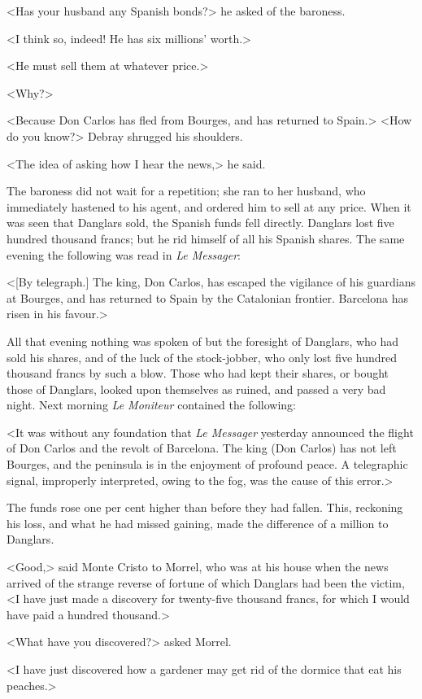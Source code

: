  <Has your husband any Spanish bonds?> he asked of the baroness. 

 <I think so, indeed! He has six millions' worth.> 

 <He must sell them at whatever price.> 

 <Why?> 

 <Because Don Carlos has fled from Bourges, and has returned to Spain.>  <How do you know?> Debray shrugged his shoulders. 

 <The idea of asking how I hear the news,> he said. 

 The baroness did not wait for a repetition; she ran to her husband, who immediately hastened to his agent, and ordered him to sell at any price. When it was seen that Danglars sold, the Spanish funds fell directly. Danglars lost five hundred thousand francs; but he rid himself of all his Spanish shares. The same evening the following was read in \textit{Le Messager}: 

 <[By telegraph.] The king, Don Carlos, has escaped the vigilance of his guardians at Bourges, and has returned to Spain by the Catalonian frontier. Barcelona has risen in his favour.> 

 All that evening nothing was spoken of but the foresight of Danglars, who had sold his shares, and of the luck of the stock-jobber, who only lost five hundred thousand francs by such a blow. Those who had kept their shares, or bought those of Danglars, looked upon themselves as ruined, and passed a very bad night. Next morning \textit{Le Moniteur} contained the following: 

 <It was without any foundation that \textit{Le Messager} yesterday announced the flight of Don Carlos and the revolt of Barcelona. The king (Don Carlos) has not left Bourges, and the peninsula is in the enjoyment of profound peace. A telegraphic signal, improperly interpreted, owing to the fog, was the cause of this error.> 

 The funds rose one per cent higher than before they had fallen. This, reckoning his loss, and what he had missed gaining, made the difference of a million to Danglars. 

 <Good,> said Monte Cristo to Morrel, who was at his house when the news arrived of the strange reverse of fortune of which Danglars had been the victim, <I have just made a discovery for twenty-five thousand francs, for which I would have paid a hundred thousand.> 

 <What have you discovered?> asked Morrel. 

 <I have just discovered how a gardener may get rid of the dormice that eat his peaches.> 